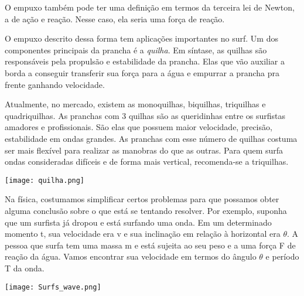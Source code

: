 \documentclass[book, 12pt, twoside, a5paper, english, brazil, sumario=tradicional, openany]{abntex2}
\begin{document}
O empuxo também pode ter uma definição em termos da terceira lei de Newton, a de ação e reação. Nesse caso, ela seria uma força de reação.

O empuxo descrito dessa forma tem aplicações importantes no surf. Um dos componentes principais da prancha é a \textit{quilha}. Em síntase, as quilhas são responsáveis pela propulsão e estabilidade da prancha. Elas que vão auxiliar a borda a conseguir transferir sua força para a água e empurrar a prancha pra frente ganhando velocidade.

Atualmente, no mercado, existem as monoquilhas, biquilhas, triquilhas e quadriquilhas. As pranchas com 3 quilhas são as queridinhas entre os surfistas amadores e profissionais. São elas que possuem maior velocidade, precisão, estabilidade em ondas grandes. As pranchas com esse número de quilhas costuma ser mais flexível para realizar as manobras do que as outras. Para quem surfa ondas consideradas difíceis e de forma mais vertical, recomenda-se a triquilhas.

\vspace{0.5cm}
\begin{center}
    \texttt{[image: quilha.png]} 
\end{center}
\vspace{-0.23cm}

\vspace{-0.8cm}

{}

\vspace{-0.3cm}

Na física, costumamos simplificar certos problemas para que possamos obter alguma conclusão sobre o que está se tentando resolver. Por exemplo, suponha que um surfista já dropou e está surfando uma onda. Em um determinado momento t, sua velocidade era v e sua inclinação em relação à horizontal era $\theta$. A pessoa que surfa tem uma massa m e está sujeita ao seu peso e a uma força F de reação da água. Vamos encontrar sua velocidade em termos do ângulo $\theta$ e período T da onda.

\vspace{0.5cm}
\begin{center}
    \texttt{[image: Surfs\_wave.png]} 
\end{center}
\vspace{-0.23cm}
\end{document}
